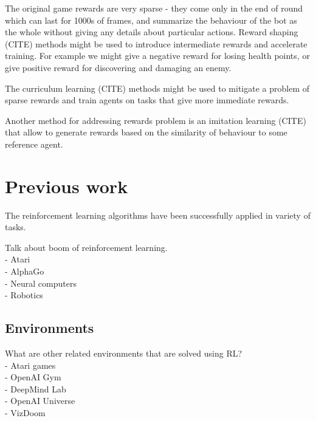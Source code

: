 
The original game rewards are very sparse - they come only in the end of round which can last for 1000s of frames, and summarize the behaviour of the bot as the whole without giving any details about particular actions.
Reward shaping (CITE) methods might be used to introduce intermediate rewards and accelerate training. For example we might give a negative reward for losing health points, or give positive reward for discovering and damaging an enemy.


The curriculum learning (CITE) methods might be used to mitigate a problem of sparse rewards and train agents on tasks that give more immediate rewards.

Another method for addressing rewards problem is an imitation learning (CITE) that allow to generate rewards based on the similarity of behaviour to some reference agent.


\section{Previous work}

The reinforcement learning algorithms have been successfully applied in variety of tasks.

Talk about boom of reinforcement learning. \\
  - Atari \\
  - AlphaGo \\
  - Neural computers \\
  - Robotics \\

\subsection{Environments}

What are other related environments that are solved using RL? \\
- Atari games \\
- OpenAI Gym \\
- DeepMind Lab \\
- OpenAI Universe \\
- VizDoom \\

